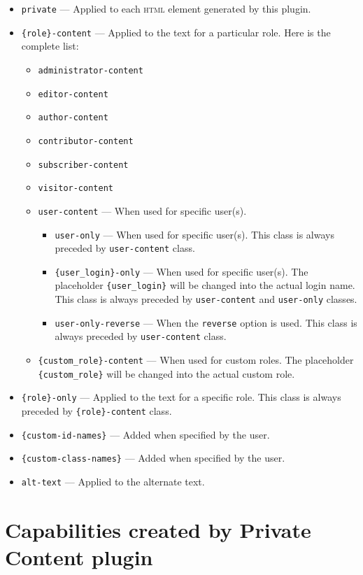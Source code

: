 \begin{itemize}
 \item \verb+private+ --- Applied to each \textsc{html} element generated by this
 plugin.
 \item \verb+{role}-content+ --- Applied to the text for a particular role. Here
 is the complete list:
 \begin{itemize}
  \item \verb+administrator-content+
  \item \verb+editor-content+
  \item \verb+author-content+
  \item \verb+contributor-content+
  \item \verb+subscriber-content+
  \item \verb+visitor-content+
  \item \verb+user-content+ --- When used for specific user(s).
  \begin{itemize}
   \item \verb+user-only+ --- When used for specific user(s). This class is always
   preceded by \verb+user-content+ class.
    \item \verb+{user_login}-only+ --- When used for specific user(s). The
    placeholder \verb+{user_login}+ will be changed into the actual login name.
    This class is always preceded by \verb+user-content+ and \verb+user-only+
    classes.
    \item \verb+user-only-reverse+ --- When the \verb+reverse+ option is used.
    This class is always preceded by \verb+user-content+ class.
  \end{itemize}
  \item \verb+{custom_role}-content+ --- When used for custom roles. The
  placeholder \verb+{custom_role}+ will be changed into the actual custom role.
  \end{itemize}
 \item \verb+{role}-only+ --- Applied to the text for a specific role. This class
 is always preceded by \verb+{role}-content+ class.
 \item \verb+{custom-id-names}+ --- Added when specified by the user.
 \item \verb+{custom-class-names}+ --- Added when specified by the user.
 \item \verb+alt-text+ --- Applied to the alternate text.
\end{itemize}

\section{Capabilities created by Private Content plugin}

